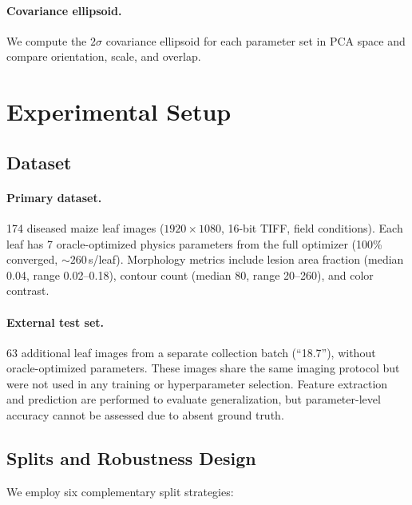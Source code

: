 \documentclass[11pt,a4paper]{article}
\begin{document}
\paragraph{Covariance ellipsoid.}
We compute the $2\sigma$ covariance ellipsoid for each parameter set
in PCA space and compare orientation, scale, and overlap.

\section{Experimental Setup}
\label{sec:experiments}

\subsection{Dataset}

\paragraph{Primary dataset.}
174 diseased maize leaf images ($1920 \times 1080$, 16-bit TIFF,
field conditions). Each leaf has 7 oracle-optimized physics parameters
from the full optimizer (100\% converged, ${\sim}260$\,s/leaf).
Morphology metrics include lesion area fraction (median 0.04, range 0.02--0.18),
contour count (median 80, range 20--260), and color contrast.

\paragraph{External test set.}
63 additional leaf images from a separate collection batch (``18.7''),
without oracle-optimized parameters. These images share the same
imaging protocol but were not used in any training or hyperparameter selection.
Feature extraction and prediction are performed to evaluate generalization,
but parameter-level accuracy cannot be assessed due to absent ground truth.

\subsection{Splits and Robustness Design}

We employ six complementary split strategies:
\end{document}
